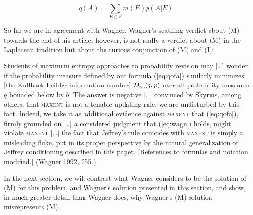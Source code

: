 \documentclass[11pt]{article}
\begin{document}
\begin{equation}
  \label{eq:qofa}
  q(A)=\sum_{E\in\mathcal{E}}m(E)p(A|E).
\end{equation}


So far we are in agreement with Wagner. Wagner's scathing verdict
about (M) towards the end of his article, however, is not really a
verdict about (M) in the Laplacean tradition but about the curious
conjunction of (M) and (I):

\begin{quotex}
  Students of maximum entropy approaches to probability revision may
  [\ldots] wonder if the probability measure defined by our formula
  (\ref{eq:qofa}) similarly minimizes [the Kullback-Leibler
  information number] $D_{\textsc{kl}}(q,p)$ over all probability
  measures $q$ bounded below by $b$. The answer is negative [\ldots]
  convinced by Skyrms, among others, that \textsc{maxent} is not a
  tenable updating rule, we are undisturbed by this fact. Indeed, we
  take it as additional evidence against \textsc{maxent} that
  (\ref{eq:qofa}), firmly grounded on [\ldots] a considered judgment
  that (\ref{eq:wagn}) holds, might violate \textsc{maxent} [\ldots]
  the fact that Jeffrey's rule coincides with \textsc{maxent} is
  simply a misleading fluke, put in its proper perspective by the
  natural generalization of Jeffrey conditioning described in
  this paper. [References to formulas and notation modified.]
  (Wagner 1992, 255.)
\end{quotex}

In the next section, we will contrast what Wagner considers to be the
solution of (M) for this problem,  and
Wagner's solution presented in this section,  and show, in much greater detail than Wagner does, why
Wagner's (M) solution misrepresents (M).
\end{document}

